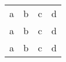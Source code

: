 \documentclass{article}
\begin{document}
\begin{tabular}{rrrr}
a&b&c&d\\
\hhline{==~=}
a&b&c&d\\
\hhline{--~-}
a&b&c&d\\
\end{tabular}
\end{document}
